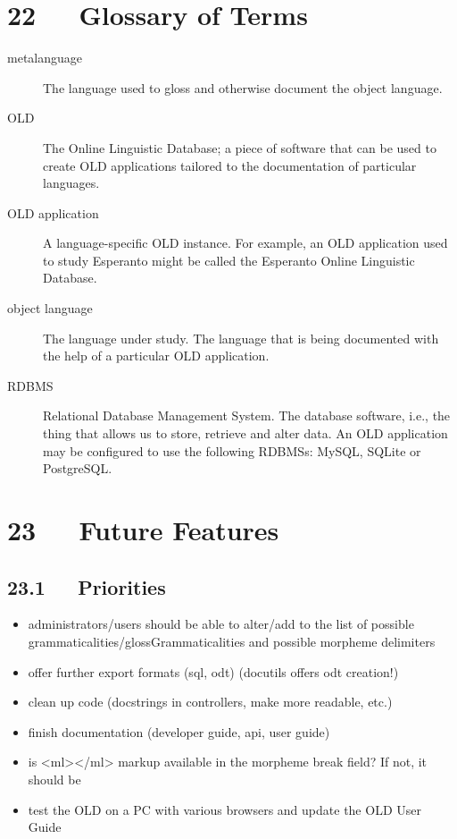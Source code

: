 \documentclass[letterpaper,10pt,english]{sphinxmanual}
\begin{document}
\chapter{22   Glossary of Terms}
\label{user_guide:glossary-of-terms}\begin{description}
\item[{metalanguage}] \leavevmode
The language used to gloss and otherwise document the object language.

\item[{OLD}] \leavevmode
The Online Linguistic Database; a piece of software that can be used to
create OLD applications tailored to the documentation of particular
languages.

\item[{OLD application}] \leavevmode
A language-specific OLD instance.  For example, an OLD application used to
study Esperanto might be called the Esperanto Online Linguistic Database.

\item[{object language}] \leavevmode
The language under study.  The language that is being documented with the
help of a particular OLD application.

\item[{RDBMS}] \leavevmode
Relational Database Management System.  The database software, i.e., the
thing that allows us to store, retrieve and alter data.  An OLD application
may be configured to use the following RDBMSs: MySQL, SQLite or PostgreSQL.

\end{description}


\chapter{23   Future Features}
\label{user_guide:future-features}

\section{23.1   Priorities}
\label{user_guide:priorities}\begin{itemize}
\item {} 
administrators/users should be able to alter/add to the list of possible
grammaticalities/glossGrammaticalities and possible morpheme delimiters

\item {} 
offer further export formats (sql, odt) (docutils offers odt creation!)

\item {} 
clean up code (docstrings in controllers, make more readable, etc.)

\item {} 
finish documentation (developer guide, api, user guide)

\item {} 
is \textless{}ml\textgreater{}\textless{}/ml\textgreater{} markup available in the morpheme break field?  If not, it should
be

\item {} 
test the OLD on a PC with various browsers and update the OLD User Guide

\end{itemize}
\end{document}
